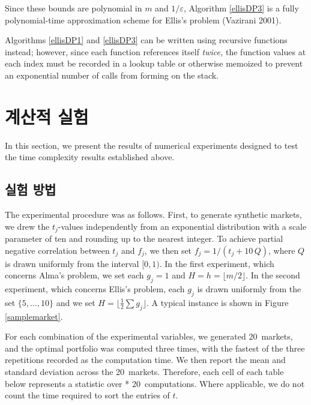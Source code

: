 \documentclass[11pt]{article} %
\newif\ifen
\theoremstyle{definition}
\theoremstyle{definition}
\begin{document}
Since these bounds are polynomial in $m$ and $1 / \varepsilon$, Algorithm \ref{ellisDP3} is a fully polynomial-time approximation scheme for Ellis's problem (Vazirani 2001). 

Algorithms \ref{ellisDP1} and \ref{ellisDP3} can be written using recursive functions instead; however, since each function references itself \emph{twice,} the function values at each index must be recorded in a lookup table or otherwise memoized to prevent an exponential number of calls from forming on the stack.



\pagebreak
\ifen \section{Numerical experiments} \else \section{계산적 실험}\fi\label{numericalexperiments}
In this section, we present the results of numerical experiments designed to test the time complexity results established above. 


\ifen \subsection{Experimental procedure} \else \subsection{실험 방법}\fi
\def\nmarkets{20}
The experimental procedure was as follows. First, to generate synthetic markets, we drew the $t_j$-values independently from an exponential distribution with a scale parameter of ten and rounding up to the nearest integer. To achieve partial negative correlation between $t_j$ and $f_j$, we then set $f_j = 1 / (t_j + 10\,Q)$, where $Q$ is drawn uniformly from the interval $[0, 1)$. In the first experiment, which concerns Alma's problem, we set each $g_j = 1$ and $H = h = \lfloor m/ 2 \rfloor$. In the second experiment, which concerns Ellis's problem, each $g_j$ is drawn uniformly from the set $\{5, \dots, 10\}$ and we set $H = \lfloor \frac{1}{2} \sum g_j \rfloor$. A typical instance is shown in Figure \ref{samplemarket}.

For each combination of the experimental variables, we generated \nmarkets~markets, and the optimal portfolio was computed three times, with the fastest of the three repetitions recorded as the computation time. We then report the mean and standard deviation across the \nmarkets~markets. Therefore, each cell of each table below represents a statistic over {\the{} * \nmarkets \relax}~computations. Where applicable, we do not count the time required to sort the entries of $t$.
\end{document}
